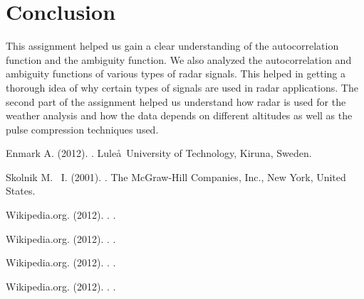 \documentclass{article}
\begin{document}
\newpage
\section{Conclusion}

This assignment helped us gain a clear understanding of the autocorrelation function and the ambiguity function. We also analyzed the autocorrelation and ambiguity functions of various types of radar signals. This helped in getting a thorough idea of why certain types of signals are used in radar applications. The second part of the assignment helped us understand how radar is used for the weather analysis and how the data depends on different altitudes as well as the pulse compression techniques used.


\begin{thebibliography}{9}

Enmark A.  (2012).
.
\newblock Lule\aa \ University of Technology, Kiruna, Sweden.

Skolnik M. ~I.  (2001).
.
\newblock The McGraw-Hill Companies, Inc., New York, United States.

Wikipedia.org. (2012).
.
.

Wikipedia.org. (2012).
.
.

Wikipedia.org. (2012).
.
.

Wikipedia.org. (2012).
.
\newline
{}.



\end{thebibliography}
\end{document}
